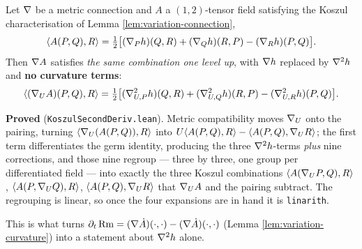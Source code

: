 \begin{lemma}
  \label{lem:koszul-second-derivative}
  \leanok
  Let $\nabla$ be a metric connection and $A$ a $(1,2)$-tensor field satisfying the Koszul
  characterisation of Lemma \ref{lem:variation-connection},
  \[
    \langle A(P,Q), R\rangle
      = \tfrac12\big[(\nabla_P h)(Q,R) + (\nabla_Q h)(R,P) - (\nabla_R h)(P,Q)\big].
  \]
  Then $\nabla A$ satisfies \emph{the same combination one level up}, with $\nabla h$
  replaced by $\nabla^2 h$ and \textbf{no curvature terms}:
  \[
    \langle (\nabla_U A)(P,Q), R\rangle
      = \tfrac12\big[(\nabla^2_{U,P} h)(Q,R) + (\nabla^2_{U,Q} h)(R,P)
        - (\nabla^2_{U,R} h)(P,Q)\big].
  \]

  \textbf{Proved} (\texttt{KoszulSecondDeriv.lean}). Metric compatibility moves
  $\nabla_U$ onto the pairing, turning $\langle \nabla_U(A(P,Q)), R\rangle$ into
  $U\langle A(P,Q),R\rangle - \langle A(P,Q), \nabla_U R\rangle$; the first term
  differentiates the germ identity, producing the three $\nabla^2h$-terms
  \emph{plus} nine corrections, and those nine regroup --- three by three, one
  group per differentiated field --- into exactly the three Koszul combinations
  $\langle A(\nabla_U P, Q),R\rangle$, $\langle A(P,\nabla_U Q),R\rangle$,
  $\langle A(P,Q),\nabla_U R\rangle$ that $\nabla_U A$ and the pairing subtract. The
  regrouping is linear, so once the four expansions are in hand it is
  \texttt{linarith}.

  This is what turns $\partial_t \operatorname{Rm} = (\nabla \dot A)(\cdot,\cdot) - (\nabla
  \dot A)(\cdot,\cdot)$ (Lemma \ref{lem:variation-curvature}) into a statement
  about $\nabla^2 h$ alone.


\end{lemma}
